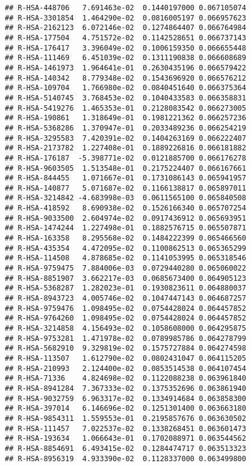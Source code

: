 \documentclass[
]{article}
\begin{document}
\begin{verbatim}
## R-HSA-448706   7.691463e-02  0.1440197000 0.067105074
## R-HSA-3301854  1.464290e-02  0.0816005197 0.066957623
## R-HSA-2162123  6.072146e-02  0.1274864407 0.066764984
## R-HSA-177504   4.751572e-02  0.1142528651 0.066737143
## R-HSA-176417   3.396049e-02  0.1006159350 0.066655448
## R-HSA-111469   6.451039e-02  0.1311190838 0.066608689
## R-HSA-1461973  1.964641e-01  0.2630435196 0.066579422
## R-HSA-140342   8.779348e-02  0.1543696920 0.066576212
## R-HSA-109704   1.766980e-02  0.0840451640 0.066375364
## R-HSA-5140745  3.768453e-02  0.1040433583 0.066358831
## R-HSA-5419276  1.465353e-01  0.2128083542 0.066273005
## R-HSA-190861   1.318649e-01  0.1981221362 0.066257236
## R-HSA-5368286  1.370947e-01  0.2033489236 0.066254219
## R-HSA-3295583  7.420391e-02  0.1404263169 0.066222407
## R-HSA-2173782  1.227408e-01  0.1889226816 0.066181882
## R-HSA-176187  -5.398771e-02  0.0121885700 0.066176278
## R-HSA-9603505  1.513548e-01  0.2175224407 0.066167661
## R-HSA-844455   1.071667e-01  0.1731086143 0.065941957
## R-HSA-140877   5.071687e-02  0.1166138817 0.065897011
## R-HSA-3214842 -4.683998e-03  0.0611565100 0.065840508
## R-HSA-418592   8.690938e-02  0.1526166340 0.065707254
## R-HSA-9033500  2.604974e-02  0.0917436912 0.065693951
## R-HSA-1474244  1.227498e-01  0.1882576715 0.065507871
## R-HSA-163358   8.295568e-02  0.1484222399 0.065466560
## R-HSA-435354   4.472095e-02  0.1100862513 0.065365299
## R-HSA-114508   4.878685e-02  0.1141053995 0.065318546
## R-HSA-9759475  7.884006e-03  0.0729440280 0.065060022
## R-HSA-8851907  3.662217e-03  0.0685673400 0.064905123
## R-HSA-5368287  1.282023e-01  0.1930823611 0.064880037
## R-HSA-8943723  4.005746e-02  0.1047447143 0.064687257
## R-HSA-9759476  1.098495e-02  0.0754428024 0.064457852
## R-HSA-9764260  1.098495e-02  0.0754428024 0.064457852
## R-HSA-3214858  4.156493e-02  0.1058608000 0.064295875
## R-HSA-9753281  1.471978e-02  0.0789985786 0.064278799
## R-HSA-5682910  9.329819e-02  0.1575727884 0.064274598
## R-HSA-113507   1.612790e-02  0.0802431047 0.064115205
## R-HSA-210993   2.124400e-02  0.0853514538 0.064107454
## R-HSA-71336    4.824698e-02  0.1122088238 0.063961840
## R-HSA-8941284  7.367333e-02  0.1375352696 0.063861940
## R-HSA-9032759  6.963317e-02  0.1334914684 0.063858300
## R-HSA-397014   6.146696e-02  0.1251301400 0.063663180
## R-HSA-9854311  1.559553e-01  0.2195857676 0.063630502
## R-HSA-111457   7.022537e-02  0.1338268451 0.063601473
## R-HSA-193634   1.066643e-01  0.1702088971 0.063544562
## R-HSA-8854691  6.493415e-02  0.1284474717 0.063513323
## R-HSA-8956319  4.933390e-02  0.1128337000 0.063499800

\end{verbatim}
\end{document}
